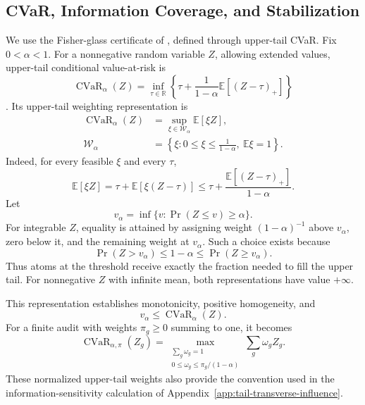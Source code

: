 \subsection{CVaR, Information Coverage, and Stabilization}
\label{app:theory-certificate}

We use the Fisher-glass certificate of \citet{mansouri_arai_2026_fisher_glasses}, defined through upper-tail CVaR. Fix \(0<\alpha<1\). For a nonnegative random variable \(Z\), allowing extended values, upper-tail conditional value-at-risk is
\[
\operatorname{CVaR}_{\alpha}(Z)
=
\inf_{\tau\in\mathbb R}
\left\{
\tau+
\frac{1}{1-\alpha}
\mathbb E[(Z-\tau)_+]
\right\}
\tag{A.24}\label{eq:cvar-definition}
\]
\citep{rockafellar2000optimization,rockafellar2002conditional}. Its upper-tail weighting representation is
\[
\begin{aligned}
\operatorname{CVaR}_{\alpha}(Z)
&=
\sup_{\xi\in\mathcal W_\alpha}
\mathbb E[\xi Z],
\\
\mathcal W_\alpha
&=
\left\{
\xi:
0\le\xi\le\frac1{1-\alpha},
\ \mathbb E\xi=1
\right\}.
\end{aligned}
\tag{A.25}\label{eq:app-cvar-dual}
\]
Indeed, for every feasible \(\xi\) and every \(\tau\),
\[
\mathbb E[\xi Z]
=
\tau+\mathbb E[\xi(Z-\tau)]
\le
\tau+\frac{\mathbb E[(Z-\tau)_+]}{1-\alpha}.
\]
Let
\[
v_\alpha
=
\inf\{v:\Pr(Z\le v)\ge\alpha\}.
\]
For integrable \(Z\), equality is attained by assigning weight \((1-\alpha)^{-1}\) above \(v_\alpha\), zero below it, and the remaining weight at \(v_\alpha\). Such a choice exists because
\[
\Pr(Z>v_\alpha)
\le
1-\alpha
\le
\Pr(Z\ge v_\alpha).
\]
Thus atoms at the threshold receive exactly the fraction needed to fill the upper tail. For nonnegative \(Z\) with infinite mean, both representations have value \(+\infty\).

This representation establishes monotonicity, positive homogeneity, and
\[
v_\alpha\le\operatorname{CVaR}_{\alpha}(Z).
\]
For a finite audit with weights \(\pi_g\ge0\) summing to one, it becomes
\[
\operatorname{CVaR}_{\alpha,\pi}(Z_g)
=
\max_{\substack{
\sum_g\omega_g=1\\
0\le\omega_g\le\pi_g/(1-\alpha)
}}
\sum_g\omega_g Z_g.
\tag{A.26}\label{eq:app-finite-cvar}
\]
These normalized upper-tail weights also provide the convention used in the information-sensitivity calculation of Appendix~\ref{app:tail-transverse-influence}.

